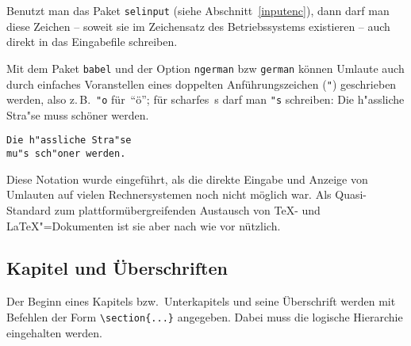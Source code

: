 Benutzt man das Paket \texttt{selinput} (siehe Abschnitt~\vref{inputenc}),
dann darf man diese Zeichen -- soweit sie im Zeichensatz des Betriebssystems
existieren -- auch direkt in das Eingabefile schreiben.

Mit dem Paket \texttt{babel} und der Option \texttt{ngerman} bzw \texttt{german}
können
Umlaute auch durch einfaches Voranstellen eines doppelten Anführungszeichen (\verb|"|) geschrieben werden, 
also z.\,B.\ \lstinline|"o| für~"`ö"';
für scharfes~s darf man \lstinline|"s| schreiben:
\exa
Die h"assliche Stra"se
muss schöner werden.
\exb
\begin{verbatim}
Die h"assliche Stra"se
mu"s sch"oner werden.
\end{verbatim}
\exc
Diese Notation wurde eingeführt, als die direkte Eingabe und
Anzeige von Umlauten auf vielen Rechnersystemen noch nicht möglich war.
Als Quasi-Standard zum plattformübergreifenden Austausch von 
\TeX- und \LaTeX"=Dokumenten ist sie aber nach wie vor nützlich.
 
\subsection{Kapitel und Überschriften}
 
Der Beginn eines Kapitels bzw.\ Unterkapitels und seine
Überschrift werden mit Befehlen der Form \lstinline|\section{...}|
angegeben. Dabei muss die logische Hierarchie eingehalten werden.

